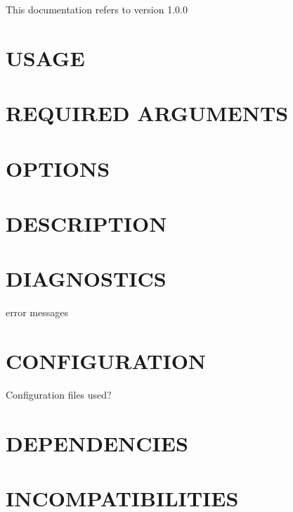 \documentclass{book}
\begin{document}
This documentation refers to version 1.0.0


\section{USAGE}
\label{_USAGE}
\hypertarget{_USAGE}{}


\section{REQUIRED ARGUMENTS}
\label{_REQUIRED_ARGUMENTS}
\hypertarget{_REQUIRED_ARGUMENTS}{}


\section{OPTIONS}
\label{_OPTIONS}
\hypertarget{_OPTIONS}{}


\section{DESCRIPTION}
\label{_DESCRIPTION}
\hypertarget{_DESCRIPTION}{}


\section{DIAGNOSTICS}
\label{_DIAGNOSTICS}
\hypertarget{_DIAGNOSTICS}{}



error messages


\section{CONFIGURATION}
\label{_CONFIGURATION}
\hypertarget{_CONFIGURATION}{}



Configuration files used?


\section{DEPENDENCIES}
\label{_DEPENDENCIES}
\hypertarget{_DEPENDENCIES}{}


\section{INCOMPATIBILITIES}
\label{_INCOMPATIBILITIES}
\hypertarget{_INCOMPATIBILITIES}{}
\end{document}

